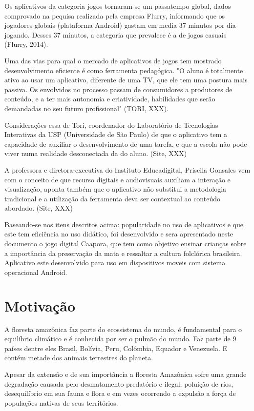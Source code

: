 	
Os aplicativos da categoria jogos tornaram-se um passatempo global, dados comprovado na pequisa  realizada pela empresa Flurry, informando que os jogadores globais (plataforma Android) gastam em media 37 minutos por dia jogando. Desses 37 minutos, a categoria que prevalece é a de jogos casuais (Flurry, 2014).

Uma das vias para qual o mercado de aplicativos de jogos tem mostrado desenvolvimento eficiente é como ferramenta pedagógica.
"O aluno é totalmente ativo ao usar um aplicativo, diferente de uma TV, que ele tem uma postura mais passiva. Os envolvidos no processo passam de consumidores a produtores de conteúdo, e a ter mais autonomia e criatividade, habilidades que serão demandadas no seu futuro profissional" (TORI, XXX).

Considerações essa de Tori, coordenador do Laboratório de Tecnologias Interativas da USP (Universidade de São Paulo) de que o aplicativo tem a capacidade de auxiliar o desenvolvimento de uma tarefa, e que a escola não pode viver numa realidade desconectada da do aluno. (Site, XXX)

A professora e diretora-executiva do Instituto Educadigital, Priscila Gonsales vem com o conceito de que recurso digitais e audiovisuais auxiliam a interação e visualização, aponta também que o aplicativo não substitui a metodologia tradicional e a utilização da ferramenta deva ser contextual ao conteúdo abordado. (Site, XXX)

Baseando-se nos itens descritos acima: popularidade no uso de aplicativos e que este tem eficiência no uso didático, foi desenvolvido e sera apresentado neste documento o jogo digital Caapora, que tem como objetivo ensinar crianças sobre a importância da preservação da mata e ressaltar a cultura folclórica brasileira.
Aplicativo este desenvolvido para uso em  dispositivos moveis com sistema operacional Android.

\section{Motivação}
\label{cap:motivacao}

A floresta amazônica faz parte do ecossistema do mundo, é fundamental para o equilíbrio climático e é conhecida por ser o pulmão do mundo. Faz parte de 9 países dentre eles Brasil, Bolívia, Peru, Colômbia, Equador e Venezuela. E contém metade dos animais terrestres do planeta.

Apesar da extensão e de sua importância a floresta Amazônica sofre uma grande degradação causada pelo desmatamento predatório e ilegal, poluição de rios, desequilíbrio em sua fauna e flora e em vezes ocorrendo a expulsão a força de populações nativas de seus territórios.

